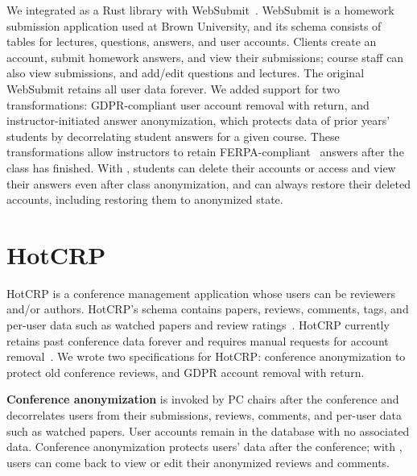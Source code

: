 %
We integrated \sys as a Rust library with WebSubmit~\cite{websubmit-rs}.
%
WebSubmit is a homework submission application used at Brown University, and
its schema consists of tables for lectures, questions, answers, and user accounts.
%
Clients create an account, submit homework answers, and view their submissions;
course staff can also view submissions, and add/edit questions and lectures.
%
The original WebSubmit retains all user data forever.
%
We added support for two \xxing
transformations: {GDPR-compliant user account removal} with return, and
{instructor-initiated answer anonymization}, which protects data of prior years'
students by decorrelating student answers for a given course.
%
These transformations allow instructors to retain FERPA-compliant~\cite{ferpa}
answers after the class has finished. %
%
With \sys, students can delete their
accounts or access and view their answers even after class anonymization,
and can always restore their deleted accounts, including restoring them to
anonymized state.
%
%


\section{HotCRP}
\label{s:case-hotcrp}

%
HotCRP is a conference management application whose users can be reviewers and/or
authors.
%
HotCRP's schema contains papers, reviews, comments, tags,
and per-user data such as watched papers and review ratings~\cite{hotcrp}.
%
HotCRP currently retains past conference data forever and requires manual
requests for account removal~\cite{hotcrp:privacy}.
%
We wrote two \xx specifications for HotCRP: conference anonymization to
protect old conference reviews, and GDPR account removal with
return.
%

%
\textbf{Conference anonymization} is invoked by PC chairs after the conference
and decorrelates users from their submissions, reviews, comments, and
per-user data such as watched papers.
%
User accounts remain in the database with no associated data.
%
Conference anonymization protects users' data after the conference; with \sys,
users can come back to view or edit their anonymized reviews and comments.
%


